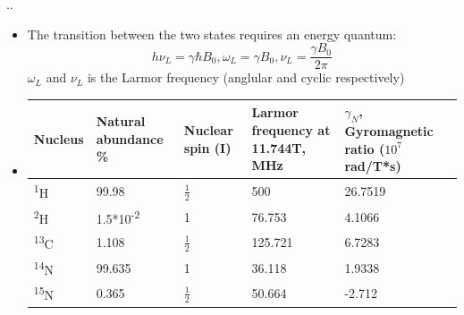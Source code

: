 \documentclass{beamer}
\begin{document}
\begin{frame}{\thesection.\thesubsection. \insertsubsection}
	\begin{itemize}[<+>]
		\item The transition between the two states requires an energy quantum:
		\begin{equation}
			h \nu_L = \gamma \hbar B_0, \omega_L = \gamma B_0, \nu_L = \dfrac{\gamma B_0}{2 \pi}
		\end{equation}
		$\omega_L$ and $\nu_L$ is the Larmor frequency (anglular and cyclic respectively)
		\item
		
\begin{table}[ht]
	\centering
	\begin{tabular}{  C{1.0cm}  C{2.5cm}  C{1.0cm}  C{2.0cm}  C{2.0cm}}
		\hline\hline
		Nucleus & Natural abundance \% & Nuclear spin (I) & Larmor frequency at 11.744T, MHz & $\gamma_N$, Gyromagnetic ratio ($10^7$ rad/T*s) \\
		\hline
		\textsuperscript{1}H & 99.98 & $\frac{1}{2}$ & 500 & 26.7519 \\
		\textsuperscript{2}H & 1.5*10\textsuperscript{-2} & 1 & 76.753 & 4.1066 \\
		\textsuperscript{13}C & 1.108 & $\frac{1}{2}$ & 125.721 & 6.7283 \\
		\textsuperscript{14}N & 99.635 & 1 & 36.118 & 1.9338 \\
		\textsuperscript{15}N & 0.365 &  $\frac{1}{2}$ & 50.664 & -2.712 \\
		\hline
	\end{tabular}
\end{table}
		
	\end{itemize}
\end{frame}
\end{document}
